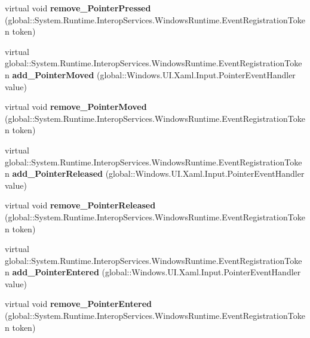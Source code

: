 \begin{DoxyCompactItemize}
virtual void {\bfseries remove\+\_\+\+Pointer\+Pressed} (global\+::\+System.\+Runtime.\+Interop\+Services.\+Windows\+Runtime.\+Event\+Registration\+Token token)
\item 
\mbox{\label{class_windows_1_1_u_i_1_1_xaml_1_1_u_i_element_a35fdbc426595a77556b9e7587b4c8f8e}} 
virtual global\+::\+System.\+Runtime.\+Interop\+Services.\+Windows\+Runtime.\+Event\+Registration\+Token {\bfseries add\+\_\+\+Pointer\+Moved} (global\+::\+Windows.\+U\+I.\+Xaml.\+Input.\+Pointer\+Event\+Handler value)
\item 
\mbox{\label{class_windows_1_1_u_i_1_1_xaml_1_1_u_i_element_a63a39b75c65106c0b053b29fc0637f66}} 
virtual void {\bfseries remove\+\_\+\+Pointer\+Moved} (global\+::\+System.\+Runtime.\+Interop\+Services.\+Windows\+Runtime.\+Event\+Registration\+Token token)
\item 
\mbox{\label{class_windows_1_1_u_i_1_1_xaml_1_1_u_i_element_ac262b01e4394eafebb2fc7c72a05c364}} 
virtual global\+::\+System.\+Runtime.\+Interop\+Services.\+Windows\+Runtime.\+Event\+Registration\+Token {\bfseries add\+\_\+\+Pointer\+Released} (global\+::\+Windows.\+U\+I.\+Xaml.\+Input.\+Pointer\+Event\+Handler value)
\item 
\mbox{\label{class_windows_1_1_u_i_1_1_xaml_1_1_u_i_element_a6b1fe59db3a3dade2439c90e7005d059}} 
virtual void {\bfseries remove\+\_\+\+Pointer\+Released} (global\+::\+System.\+Runtime.\+Interop\+Services.\+Windows\+Runtime.\+Event\+Registration\+Token token)
\item 
\mbox{\label{class_windows_1_1_u_i_1_1_xaml_1_1_u_i_element_a62b58e40180ca9bf1db42ed2d6038c28}} 
virtual global\+::\+System.\+Runtime.\+Interop\+Services.\+Windows\+Runtime.\+Event\+Registration\+Token {\bfseries add\+\_\+\+Pointer\+Entered} (global\+::\+Windows.\+U\+I.\+Xaml.\+Input.\+Pointer\+Event\+Handler value)
\item 
\mbox{\label{class_windows_1_1_u_i_1_1_xaml_1_1_u_i_element_a7f81753f2c0c006e2fa7fc60206ef8fe}} 
virtual void {\bfseries remove\+\_\+\+Pointer\+Entered} (global\+::\+System.\+Runtime.\+Interop\+Services.\+Windows\+Runtime.\+Event\+Registration\+Token token)

\end{DoxyCompactItemize}
